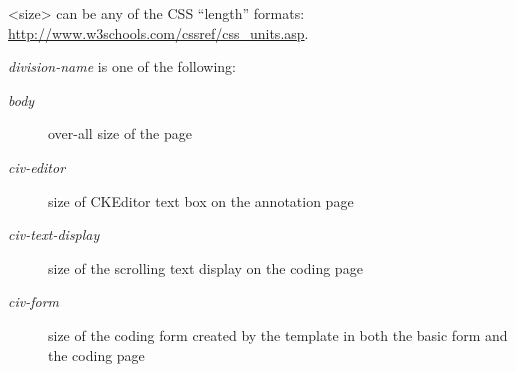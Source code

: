 \documentclass[letterpaper,10pt,english]{sphinxmanual}
\begin{document}
\textless{}size\textgreater{} can be any of the CSS “length” formats: \href{http://www.w3schools.com/cssref/css\_units.asp}{http://www.w3schools.com/cssref/css\_units.asp}.

\emph{division-name} is one of the following:
\begin{description}
\item[{\emph{body}}] \leavevmode
over-all size of the page

\item[{\emph{civ-editor}}] \leavevmode
size of CKEditor text box on the annotation page

\item[{\emph{civ-text-display}}] \leavevmode
size of the scrolling text display on the coding page

\item[{\emph{civ-form}}] \leavevmode
size of the coding form created by the template in both the basic form and the coding page

\end{description}
\end{document}
